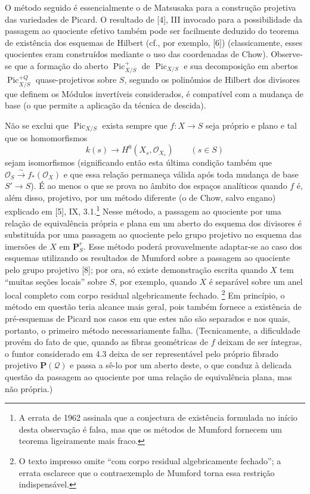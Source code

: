  O método seguido é essencialmente o de Matsusaka para
a construção projetiva das variedades de Picard. O resultado de [4], III
invocado para a possibilidade da passagem ao quociente efetivo também pode ser
facilmente deduzido do teorema de existência dos esquemas de Hilbert (cf., por
exemplo, [6]) (classicamente, esses quocientes eram construídos mediante o uso
das coordenadas de Chow). Observe-se que a formação do aberto
$\operatorname{Pic}^{+}_{X/S}$ de $\operatorname{Pic}_{X/S}$ e sua decomposição
em abertos $\operatorname{Pic}^{+Q}_{X/S}$ quase-projetivos sobre $S$, segundo
os polinômios de Hilbert dos divisores que definem os Módulos invertíveis
considerados, é compatível com a mudança de base (o que permite a aplicação da
técnica de descida).

 Não se exclui que $\operatorname{Pic}_{X/S}$ exista
sempre que $f:X\longrightarrow S$ seja próprio e plano e tal que os
homomorfismos
\[
k(s)\longrightarrow H^0(X_s,\mathcal O_{X_s})\qquad(s\in S)
\]
sejam isomorfismos (significando então esta última condição também que
$\mathcal O_S\xrightarrow{\sim}f_*(\mathcal O_X)$ e que essa relação permaneça
válida após toda mudança de base $S'\longrightarrow S$). É ao menos o que se
prova no âmbito dos espaços analíticos quando $f$ é, além disso, projetivo, por
um método diferente (o de Chow, salvo engano) explicado em [5], IX,
3.1.\footnote{A errata de 1962 assinala que a conjectura de existência formulada
no início desta observação é falsa, mas que os métodos de Mumford fornecem um
teorema ligeiramente mais fraco.} Nesse método, a passagem ao
quociente por uma relação de equivalência própria e plana em um aberto do
esquema dos divisores é substituída por uma passagem ao quociente pelo grupo
projetivo no esquema das imersões de $X$ em $\mathbf P^r_S$. Esse método poderá
provavelmente adaptar-se ao caso dos esquemas utilizando os resultados de
Mumford sobre a passagem ao quociente pelo grupo projetivo [8]; por ora, só
existe demonstração escrita quando $X$ tem ``muitas seções locais'' sobre $S$,
por exemplo, quando $X$ é separável sobre um anel local completo com corpo
residual algebricamente fechado.
\footnote{O texto impresso omite ``com corpo residual algebricamente fechado'';
a errata esclarece que o contraexemplo de Mumford torna essa restrição
indispensável.} Em princípio, o método em questão teria alcance mais geral,
pois também fornece a existência de pré-esquemas de Picard nos casos em que
estes não são separados e nos quais, portanto, o primeiro método necessariamente
falha. (Tecnicamente, a dificuldade provém do fato de que, quando as fibras
geométricas de $f$ deixam de ser íntegras, o funtor considerado em 4.3 deixa de
ser representável pelo próprio fibrado projetivo $\mathbf P(\mathcal Q)$ e
passa a sê-lo por um aberto deste, o que conduz à delicada questão da passagem
ao quociente por uma relação de equivalência plana, mas não própria.)

